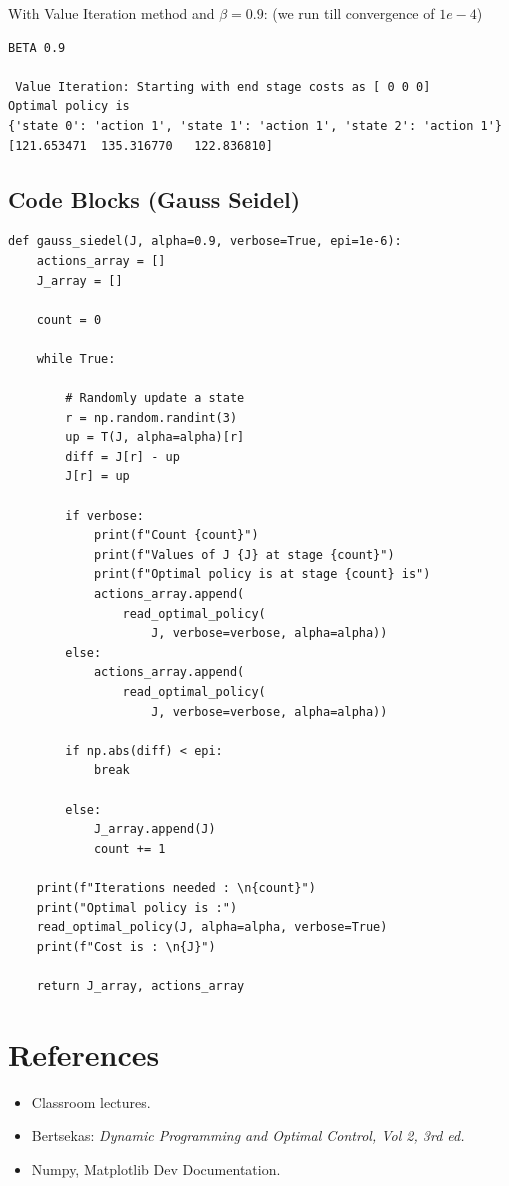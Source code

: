 With Value Iteration method and $\beta = 0.9$: (we run till convergence of $1e-4$)

\begin{lstlisting}
BETA 0.9

 Value Iteration: Starting with end stage costs as [ 0 0 0]
Optimal policy is 
{'state 0': 'action 1', 'state 1': 'action 1', 'state 2': 'action 1'}
[121.653471  135.316770   122.836810]
\end{lstlisting}

\subsection {Code Blocks (Gauss Seidel)}
\begin{lstlisting}
def gauss_siedel(J, alpha=0.9, verbose=True, epi=1e-6):
    actions_array = []
    J_array = []

    count = 0

    while True:

        # Randomly update a state
        r = np.random.randint(3)
        up = T(J, alpha=alpha)[r]
        diff = J[r] - up
        J[r] = up

        if verbose:
            print(f"Count {count}")
            print(f"Values of J {J} at stage {count}")
            print(f"Optimal policy is at stage {count} is")
            actions_array.append(
                read_optimal_policy(
                    J, verbose=verbose, alpha=alpha))
        else:
            actions_array.append(
                read_optimal_policy(
                    J, verbose=verbose, alpha=alpha))

        if np.abs(diff) < epi:
            break

        else:
            J_array.append(J)
            count += 1

    print(f"Iterations needed : \n{count}")
    print("Optimal policy is :")
    read_optimal_policy(J, alpha=alpha, verbose=True)
    print(f"Cost is : \n{J}")

    return J_array, actions_array
\end{lstlisting}
\bigskip

\section{References}
\begin{itemize}
\item Classroom lectures.
\item Bertsekas:\textit{ Dynamic Programming and Optimal Control, Vol 2, 3rd ed.}
\item Numpy, Matplotlib Dev Documentation.
\end{itemize}

